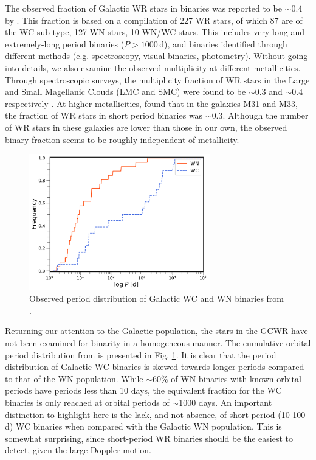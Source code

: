 The observed fraction of Galactic WR stars in binaries was reported to be ${\sim}0.4$ by  . This fraction is based on a compilation of 227 WR stars, of which 87 are of the WC sub-type, 127 WN stars, 10 WN/WC stars. This includes very-long and extremely-long period binaries ($P>1000\,$d), and binaries identified through different methods (e.g. spectroscopy, visual binaries, photometry). Without going into details, we also examine the observed multiplicity at different metallicities. Through spectroscopic surveys, the multiplicity fraction of WR stars in the Large and Small Magellanic Clouds (LMC and SMC) were found to be ${\sim}0.3$ and ${\sim}0.4$ respectively \citep{bartzakos_magellanic_2001,foellmi_wolf-rayet_2003,foellmi_wolf-rayet_2003-1,schnurr_spectroscopic_2008}. At higher metallicities, \citet{neugent_close_2014} found that in the galaxies M31 and M33, the fraction of WR stars in short period binaries was ${\sim}0.3$.  Although the number of WR stars in these galaxies are lower than those in our own, the observed binary fraction seems to be roughly independent of metallicity. 


\begin{figure}
    \centering
    \includegraphics[width=0.7\textwidth]{chapters/introduction/image/Cumulative_pobs_withdust.pdf}
    \caption{Observed period distribution of Galactic WC and WN binaries from .}
    \label{fig:obs_pdist}
\end{figure}

Returning our attention to the Galactic population, the stars in the GCWR have not been examined for binarity in a homogeneous manner. The cumulative orbital period distribution from  is presented in Fig. \ref{fig:obs_pdist}. It is clear that the period distribution of Galactic WC binaries is skewed towards longer periods compared to that of the WN population. While ${\sim}60$\% of WN binaries with known orbital periods have periods less than 10 days, the equivalent fraction for the WC binaries is only reached at orbital periods of ${\sim}$1000 days. An important distinction to highlight here is the lack, and not absence, of short-period (10-100\,d) WC binaries when compared with the Galactic WN population. This is somewhat surprising, since short-period WR binaries should be the easiest to detect, given the large Doppler motion. 

